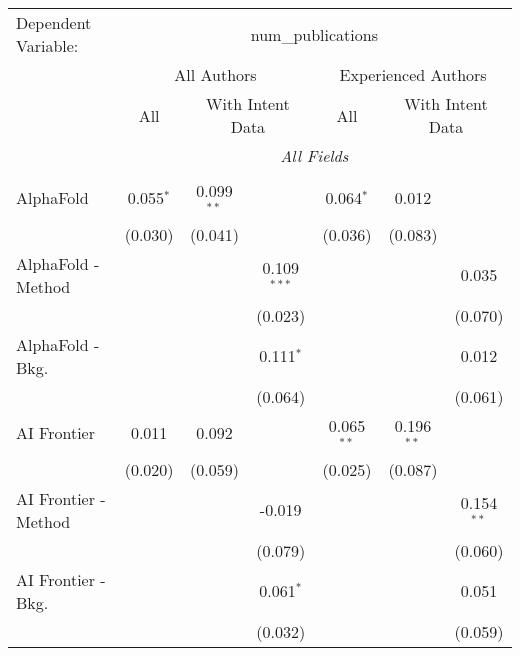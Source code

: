 \begingroup
\centering
\begin{tabular}{lcccccc}
   \tabularnewline \midrule \midrule
   Dependent Variable: & \multicolumn{6}{c}{num\_publications}\\
 & \multicolumn{3}{c}{All Authors} & \multicolumn{3}{c}{Experienced Authors} \\
\cmidrule(lr){2-4} \cmidrule(lr){5-7}
 & \multicolumn{1}{c}{All} & \multicolumn{2}{c}{With Intent Data} & \multicolumn{1}{c}{All} & \multicolumn{2}{c}{With Intent Data} \\
\cmidrule(lr){2-2} \cmidrule(lr){3-4} \cmidrule(lr){5-5} \cmidrule(lr){6-7}
 & \multicolumn{6}{c}{\textit{All Fields}} \\ \\
   AlphaFold            & 0.055$^{*}$   & 0.099$^{**}$ &               & 0.064$^{*}$   & 0.012        &   \\   
                        & (0.030)       & (0.041)      &               & (0.036)       & (0.083)      &   \\   
   AlphaFold - Method   &               &              & 0.109$^{***}$ &               &              & 0.035\\   
                        &               &              & (0.023)       &               &              & (0.070)\\   
   AlphaFold - Bkg.     &               &              & 0.111$^{*}$   &               &              & 0.012\\   
                        &               &              & (0.064)       &               &              & (0.061)\\   
   AI Frontier          & 0.011         & 0.092        &               & 0.065$^{**}$  & 0.196$^{**}$ &   \\   
                        & (0.020)       & (0.059)      &               & (0.025)       & (0.087)      &   \\   
   AI Frontier - Method &               &              & -0.019        &               &              & 0.154$^{**}$\\   
                        &               &              & (0.079)       &               &              & (0.060)\\   
   AI Frontier - Bkg.   &               &              & 0.061$^{*}$   &               &              & 0.051\\   
                        &               &              & (0.032)       &               &              & (0.059)\\   

\end{tabular}
